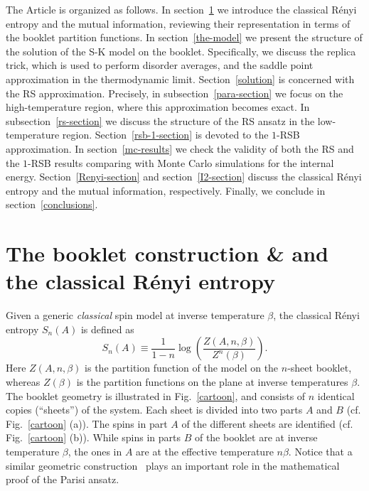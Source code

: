 \documentclass[twocolumn,superscriptaddress,prb,10pt]{revtex4-1}
\begin{document}
The Article is organized as follows. In section~\ref{booklet} we introduce the classical 
R\'enyi entropy and the mutual information, reviewing their representation in terms of 
the booklet partition functions. In section~\ref{the-model} we present the structure of 
the solution of the S-K model on the booklet. Specifically, we discuss the replica 
trick, which is used to perform disorder averages, and the saddle point approximation in 
the thermodynamic limit. Section~\ref{solution} is concerned with the RS approximation. 
Precisely, in subsection~\ref{para-section} we focus on the high-temperature 
region, where this approximation becomes exact. In subsection~\ref{rs-section} we discuss 
the structure of the RS ansatz in the low-temperature region. Section~\ref{rsb-1-section} 
is devoted to   the $1$-RSB approximation. In section~\ref{mc-results} we check the validity 
of both the RS and the $1$-RSB results comparing with Monte Carlo simulations for the 
internal energy. Section~\ref{Renyi-section} and section~\ref{I2-section} discuss the classical R\'enyi 
entropy and the mutual information, respectively. Finally, we conclude in section~\ref{conclusions}.



\section{The booklet construction \& and the classical R\'enyi entropy}
\label{booklet}

Given a generic \emph{classical} spin model at inverse temperature $\beta$, 
the classical R\'enyi entropy $S_n(A)$ is defined as~\cite{jaconis-2013,stephan-2014} 
%
\begin{equation}
\label{renyi}
S_n(A)\equiv \frac{1}{1-n}\log\left(\frac{Z(A,n,\beta)}{Z^n(\beta)}\right).
\end{equation}
%
Here $Z(A,n,\beta)$ is the partition function of the model on the $n$-sheet booklet, 
whereas $Z(\beta)$ is the partition functions on the plane at inverse temperatures 
$\beta$. The booklet geometry is illustrated in Fig.~\ref{cartoon}, and consists of 
$n$ identical copies (``sheets'') of the system. Each sheet is divided into two 
parts $A$ and $B$ (cf. Fig.~\ref{cartoon} (a)). The spins in part $A$ of the different 
sheets are identified (cf. Fig.~\ref{cartoon} (b)). While spins in parts $B$ of the booklet 
are at inverse temperature $\beta$, the ones in $A$ are at the effective temperature $n\beta$. 
Notice that a similar geometric construction~\cite{guerra-2002} plays an important role in the 
mathematical proof of the Parisi ansatz. 
\end{document}
